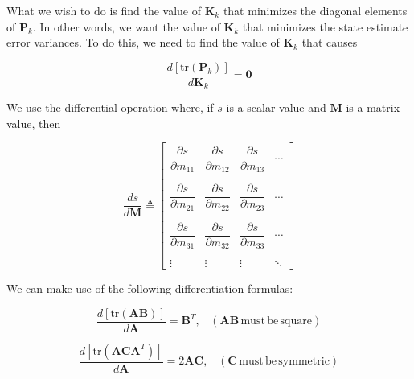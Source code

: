 \documentclass[12pt]{article}
\begin{document}
What we wish to do is find the value of $\mathbf{K}_k$ that minimizes the diagonal
elements of $\mathbf{P}_k$. In other words, we want the value of $\mathbf{K}_k$ that
minimizes the state estimate error variances. To do this, we need to find the value of
$\mathbf{K}_k$ that causes

\begin{equation*}
    \frac {d \left[ \mathrm{tr} \left( \mathbf{P}_k \right) \right] } {d \mathbf{K}_k} = \mathbf{0}
\end{equation*}

We use the differential operation where, if $s$ is a scalar value and $\mathbf{M}$ is a
matrix value, then

\begin{equation*}
    \frac {d s} {d \mathbf{M}} \triangleq 
    \begin{bmatrix}
        \dfrac{\partial s}{\partial m_{11}} & \dfrac{\partial s}{\partial m_{12}} & \dfrac{\partial s}{\partial m_{13}} & \cdots \\
        \phantom{.} \\
        \dfrac{\partial s}{\partial m_{21}} & \dfrac{\partial s}{\partial m_{22}} & \dfrac{\partial s}{\partial m_{23}} & \cdots \\
        \phantom{.} \\
        \dfrac{\partial s}{\partial m_{31}} & \dfrac{\partial s}{\partial m_{32}} & \dfrac{\partial s}{\partial m_{33}} & \cdots \\
        \phantom{.} \\
        \vdots & \vdots & \vdots & \ddots
    \end{bmatrix}
\end{equation*}

We can make use of the following differentiation formulas:

\begin{equation*}
    \frac {d \left[ \mathrm{tr} \left( \mathbf{A} \mathbf{B} \right) \right] } {d \mathbf{A}} = \mathbf{B}^T , \phantom{X} (\mathbf{A} \mathbf{B} \, \mathrm{must} \, \mathrm{be} \, \mathrm{square})
\end{equation*}

\begin{equation*}
    \frac {d \left[ \mathrm{tr} \left( \mathbf{A} \mathbf{C} \mathbf{A}^T \right) \right]} {d \mathbf{A}} = 2 \mathbf{A} \mathbf{C} , \phantom{X} (\mathbf{C} \, \mathrm{must} \, \mathrm{be} \, \mathrm{symmetric})
\end{equation*}
\end{document}
